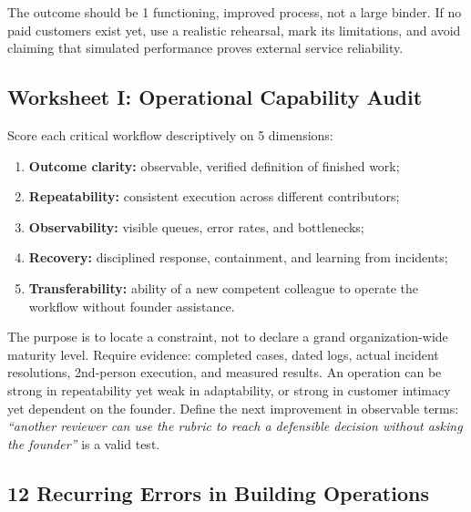 The outcome should be 1 functioning, improved process, not a large binder. If no paid customers exist yet, use a realistic rehearsal, mark its limitations, and avoid claiming that simulated performance proves external service reliability.

\subsection{Worksheet I: Operational Capability Audit}
\label{sec:worksheet_i_capability_audit}

Score each critical workflow descriptively on 5 dimensions:
\begin{enumerate}
    \item \textbf{Outcome clarity:} observable, verified definition of finished work;
    \item \textbf{Repeatability:} consistent execution across different contributors;
    \item \textbf{Observability:} visible queues, error rates, and bottlenecks;
    \item \textbf{Recovery:} disciplined response, containment, and learning from incidents;
    \item \textbf{Transferability:} ability of a new competent colleague to operate the workflow without founder assistance.
\end{enumerate}

The purpose is to locate a constraint, not to declare a grand organization-wide maturity level. Require evidence: completed cases, dated logs, actual incident resolutions, 2nd-person execution, and measured results. An operation can be strong in repeatability yet weak in adaptability, or strong in customer intimacy yet dependent on the founder. Define the next improvement in observable terms: \textit{``another reviewer can use the rubric to reach a defensible decision without asking the founder''} is a valid test.

\subsection{12 Recurring Errors in Building Operations}
\label{sec:twelve_recurring_errors}

